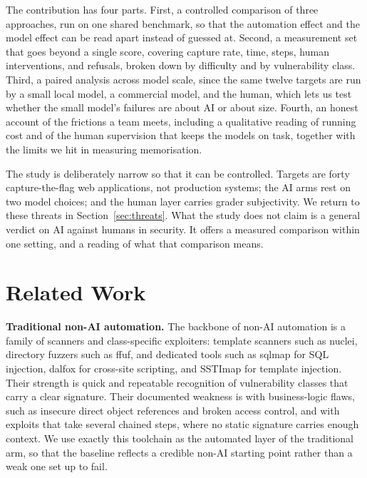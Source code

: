 \documentclass[conference]{IEEEtran}
\begin{document}
The contribution has four parts. First, a controlled comparison of three approaches, run on one shared benchmark, so that the automation effect and the model effect can be read apart instead of guessed at. Second, a measurement set that goes beyond a single score, covering capture rate, time, steps, human interventions, and refusals, broken down by difficulty and by vulnerability class. Third, a paired analysis across model scale, since the same twelve targets are run by a small local model, a commercial model, and the human, which lets us test whether the small model's failures are about AI or about size. Fourth, an honest account of the frictions a team meets, including a qualitative reading of running cost and of the human supervision that keeps the models on task, together with the limits we hit in measuring memorisation.

The study is deliberately narrow so that it can be controlled. Targets are forty capture-the-flag web applications, not production systems; the AI arms rest on two model choices; and the human layer carries grader subjectivity. We return to these threats in Section~\ref{sec:threats}. What the study does not claim is a general verdict on AI against humans in security. It offers a measured comparison within one setting, and a reading of what that comparison means.

\section{Related Work}

\textbf{Traditional non-AI automation.}
The backbone of non-AI automation is a family of scanners and class-specific exploiters: template scanners such as nuclei, directory fuzzers such as ffuf, and dedicated tools such as sqlmap for SQL injection, dalfox for cross-site scripting, and SSTImap for template injection. Their strength is quick and repeatable recognition of vulnerability classes that carry a clear signature. Their documented weakness is with business-logic flaws, such as insecure direct object references and broken access control, and with exploits that take several chained steps, where no static signature carries enough context. We use exactly this toolchain as the automated layer of the traditional arm, so that the baseline reflects a credible non-AI starting point rather than a weak one set up to fail.
\end{document}
